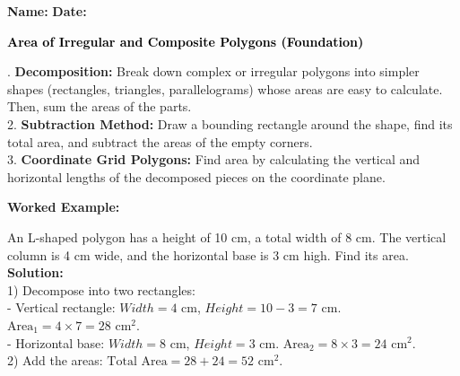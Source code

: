\documentclass[12pt, letterpaper, fleqn]{article}
\begin{document}
\textbf{Name:} \underline{\hspace{5cm}}
\hfill
\textbf{Date:} \underline{\hspace{3cm}}\\

\begin{tcolorbox}[colback=black!10]
    \large\textcolor{black}{\textbf{Area of Irregular and Composite Polygons (Foundation)}}
\end{tcolorbox}

\vspace{3mm}

. \textbf{Decomposition:} Break down complex or irregular polygons into simpler shapes (rectangles, triangles, parallelograms) whose areas are easy to calculate. Then, sum the areas of the parts. \\
2. \textbf{Subtraction Method:} Draw a bounding rectangle around the shape, find its total area, and subtract the areas of the empty corners. \\
3. \textbf{Coordinate Grid Polygons:} Find area by calculating the vertical and horizontal lengths of the decomposed pieces on the coordinate plane.

\vspace{4mm}

\begin{tcolorbox}[colback=white, colframe=black!25, boxrule=0.6pt, arc=4mm, left=6mm, right=6mm, top=5mm, bottom=5mm]
\textbf{Worked Example:}

\medskip
\noindent
An L-shaped polygon has a height of 10 cm, a total width of 8 cm. The vertical column is 4 cm wide, and the horizontal base is 3 cm high. Find its area.\\
\textbf{Solution:} \\
1) Decompose into two rectangles:\\
- Vertical rectangle: $Width = 4\text{ cm}$, $Height = 10 - 3 = 7\text{ cm}$. $\text{Area}_1 = 4 \times 7 = 28\text{ cm}^2$.\\
- Horizontal base: $Width = 8\text{ cm}$, $Height = 3\text{ cm}$. $\text{Area}_2 = 8 \times 3 = 24\text{ cm}^2$.\\
2) Add the areas: $\text{Total Area} = 28 + 24 = 52\text{ cm}^2$.
\end{tcolorbox}

\vspace{4mm}
\end{document}
